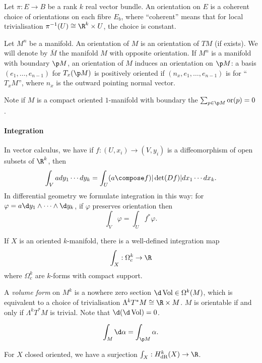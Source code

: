 \documentclass[a4paper]{article}
\newcommand{\w}{\wedge} %
\DeclareMathOperator{\Vol}{Vol} %
\begin{document}
Let \(\pi: E \to B\) be a rank \(k\) real vector bundle. An orientation on \(E\) is a coherent choice of orientations on each fibre \(E_b\), where ``coherent'' means that for local trivialisation \(\pi^{-1}(U) \cong \R^k \times U\), the choice is constant.

Let \(M^n\) be a manifold. An orientation of \(M\) is an orientation of \(TM\) (if exists). We will denote by \(\overline M\) the manifold \(M\) with opposite orientation. If \(M^n\) is a manifold with boundary \(\p M\), an orientation of \(M\) induces an orientation on \(\p M\): a basis \((e_1, \dots, e_{n - 1})\) for \(T_x(\p M)\) is positively oriented if \((n_x, e_1, \dots, e_{n - 1})\) is for ``\(T_xM\)'', where \(n_x\) is the outward pointing normal vector.

Note if \(M\) is a compact oriented \(1\)-manifold with boundary the \(\sum_{p \in \p M} \operatorname{or}(p) = 0\).

\paragraph{Integration}

In vector calculus, we have if \(f: (U, x_i) \to (V, y_i)\) is a diffeomorphism of open subsets of \(\R^k\), then
\[
  \int_V a dy_1 \cdots dy_k = \int_U (a \compose f) |\det(Df)| dx_1 \cdots dx_k.
\]
In differential geometry we formulate integration in this way: for \(\varphi = a \d y_1 \w \cdots \w \d y_k\), if \(\varphi\) preserves orientation then
\[
  \int_V \varphi = \int_U f^* \varphi.
\]

\begin{lemma}
  If \(X\) is an oriented \(k\)-manifold, there is a well-defined integration map
  \[
    \int_X: \Omega^k_c \to \R
  \]
  where \(\Omega^k_c\) are \(k\)-forms with compact support.
\end{lemma}

A \emph{volume form} on \(M^k\) is a nowhere zero section \(\d \Vol \in \Omega^k(M)\), which is equivalent to a choice of trivialisation \(\Lambda^kT^*M \cong \R \times M\). \(M\) is orientable if and only if \(\Lambda^kT^*M\) is trivial. Note that \(\d (\d \Vol) = 0\).

\begin{theorem}[Stokes]
  \[
    \int_M \d \alpha = \int_{\p M} \alpha.
  \]
\end{theorem}

\begin{corollary}
  For \(X\) closed oriented, we have a surjection \(\int_X: H^k_{\text{dR}}(X) \to \R\).
\end{corollary}
\end{document}
